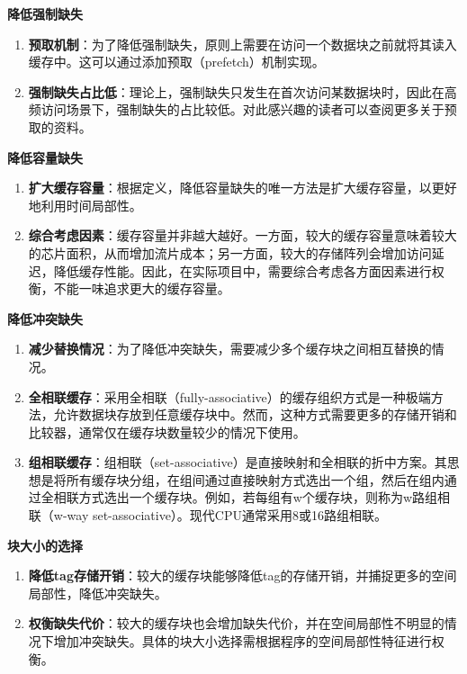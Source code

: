 \textbf{降低强制缺失}

\begin{enumerate}
\def\labelenumi{\arabic{enumi}.}
\tightlist
\item
  \textbf{预取机制}：为了降低强制缺失，原则上需要在访问一个数据块之前就将其读入缓存中。这可以通过添加预取（prefetch）机制实现。
\item
  \textbf{强制缺失占比低}：理论上，强制缺失只发生在首次访问某数据块时，因此在高频访问场景下，强制缺失的占比较低。对此感兴趣的读者可以查阅更多关于预取的资料。
\end{enumerate}

\textbf{降低容量缺失}

\begin{enumerate}
\def\labelenumi{\arabic{enumi}.}
\tightlist
\item
  \textbf{扩大缓存容量}：根据定义，降低容量缺失的唯一方法是扩大缓存容量，以更好地利用时间局部性。
\item
  \textbf{综合考虑因素}：缓存容量并非越大越好。一方面，较大的缓存容量意味着较大的芯片面积，从而增加流片成本；另一方面，较大的存储阵列会增加访问延迟，降低缓存性能。因此，在实际项目中，需要综合考虑各方面因素进行权衡，不能一味追求更大的缓存容量。
\end{enumerate}

\textbf{降低冲突缺失}

\begin{enumerate}
\def\labelenumi{\arabic{enumi}.}
\tightlist
\item
  \textbf{减少替换情况}：为了降低冲突缺失，需要减少多个缓存块之间相互替换的情况。
\item
  \textbf{全相联缓存}：采用全相联（fully-associative）的缓存组织方式是一种极端方法，允许数据块存放到任意缓存块中。然而，这种方式需要更多的存储开销和比较器，通常仅在缓存块数量较少的情况下使用。
\item
  \textbf{组相联缓存}：组相联（set-associative）是直接映射和全相联的折中方案。其思想是将所有缓存块分组，在组间通过直接映射方式选出一个组，然后在组内通过全相联方式选出一个缓存块。例如，若每组有w个缓存块，则称为w路组相联（w-way set-associative）。现代CPU通常采用8或16路组相联。
\end{enumerate}

\textbf{块大小的选择}

\begin{enumerate}
\def\labelenumi{\arabic{enumi}.}
\tightlist
\item
  \textbf{降低tag存储开销}：较大的缓存块能够降低tag的存储开销，并捕捉更多的空间局部性，降低冲突缺失。
\item
  \textbf{权衡缺失代价}：较大的缓存块也会增加缺失代价，并在空间局部性不明显的情况下增加冲突缺失。具体的块大小选择需根据程序的空间局部性特征进行权衡。
\end{enumerate}

